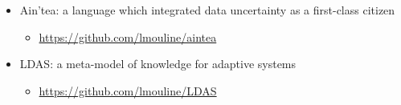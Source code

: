 \begin{itemize}
	\item Ain'tea: a language which integrated data uncertainty as a first-class citizen
	\begin{itemize}
		\item \url{https://github.com/lmouline/aintea}
	\end{itemize}
	\item LDAS: a meta-model of knowledge for adaptive systems
	\begin{itemize}
		\item \url{https://github.com/lmouline/LDAS}
	\end{itemize}
\end{itemize}